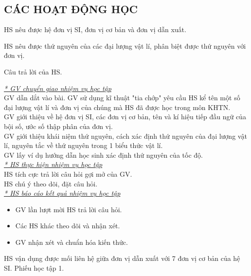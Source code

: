\subsection{CÁC HOẠT ĐỘNG HỌC}
{
HS nêu được hệ đơn vị SI, đơn vị cơ bản và đơn vị dẫn xuất.

HS nêu được thứ nguyên của các đại lượng vật lí, phân biệt được thứ nguyên với đơn vị.
}
{
Câu trả lời của HS.
}
{
\textit{\underline{* GV chuyển giao nhiệm vụ học tập}}\\
GV dẫn dắt vào bài. GV sử dụng kĩ thuật "tia chớp" yêu cầu HS kể tên một số đại lượng vật lí và đơn vị của chúng mà HS đã được học trong môn KHTN.\\
GV giới thiệu về hệ đơn vị SI, các đơn vị cơ bản, tên và kí hiệu tiếp đầu ngữ của bội số, ước số thập phân của đơn vị.\\
GV giới thiệu khái niệm thứ nguyên, cách xác định thứ nguyên của đại lượng vật lí, nguyên tắc về thứ nguyên trong 1 biểu thức vật lí.\\
GV lấy ví dụ hướng dẫn học sinh xác định thứ nguyên của tốc độ.\\
\textit{\underline{* HS thực hiện nhiệm vụ học tập}}\\
HS tích cực trả lời câu hỏi gợi mở của GV.\\
HS chú ý theo dõi, đặt câu hỏi.\\
\textit{\underline{* HS báo cáo kết quả nhiệm vụ học tập}}
\begin{itemize}[label=-]
	\item GV lần lượt mời HS trả lời câu hỏi.
	\item Các HS khác theo dõi và nhận xét.
	\item GV nhận xét và chuẩn hóa kiến thức.
\end{itemize}
}
{
HS vận dụng được mối liên hệ giữa đơn vị dẫn xuất với 7 đơn vị cơ bản của hệ SI.
}
{
Phiếu học tập 1.
}
